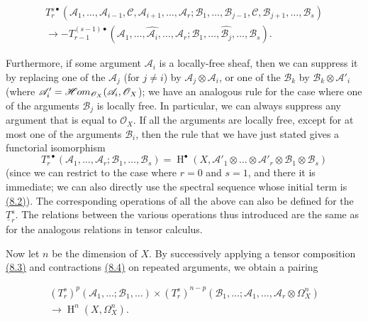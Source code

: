 \documentclass{article}
\newenvironment{eqenv}
  {}
  {}
\theoremstyle{definition}
\theoremstyle{definition}
\theoremstyle{definition}
\theoremstyle{definition}
\theoremstyle{remark}
\begin{document}
\leavevmode{}%
\begin{eqenv}
\[
  \begin{gathered}
    T_r^{s\bullet}({\mathscr{A}}_1,\ldots,{\mathscr{A}}_{i-1},{\mathscr{C}},{\mathscr{A}}_{i+1},\ldots,{\mathscr{A}}_r;{\mathscr{B}}_1,\ldots,{\mathscr{B}}_{j-1},{\mathscr{C}},{\mathscr{B}}_{j+1},\ldots,{\mathscr{B}}_s)
  \\\to -T_{r-1}^{(s-1)\bullet}({\mathscr{A}}_1,\ldots,\widehat{{\mathscr{A}}_i},\ldots,{\mathscr{A}}_r;{\mathscr{B}}_1,\ldots,\widehat{{\mathscr{B}}_j},\ldots,{\mathscr{B}}_s).
  \end{gathered}
\tag{8.4}
\]

\end{eqenv}

Furthermore, if some argument \({\mathscr{A}}_i\) is a locally-free sheaf, then we can suppress it by replacing one of the \({\mathscr{A}}_j\) (for \(j\neq i\)) by \({\mathscr{A}}_j\otimes{\mathscr{A}}_i\), or one of the \({\mathscr{B}}_k\) by \({\mathscr{B}}_k\otimes{\mathscr{A}}'_i\) (where \({\mathscr{A}}'_i=\mathscr{H}\kern -.5pt om_{{\mathscr{O}}_X}({\mathscr{A}}_i,{\mathscr{O}}_X\));
we have an analogous rule for the case where one of the arguments \({\mathscr{B}}_j\) is locally free.
In particular, we can always suppress any argument that is equal to \({\mathscr{O}}_X\).
If all the arguments are locally free, except for at most one of the arguments \({\mathscr{B}}_i\), then the rule that we have just stated gives a functorial isomorphism
\[
  T_r^{s\bullet}({\mathscr{A}}_1,\ldots,{\mathscr{A}}_r;{\mathscr{B}}_1,\ldots,{\mathscr{B}}_s)
  = \operatorname{H}^\bullet(X,{\mathscr{A}}'_1\otimes\ldots\otimes{\mathscr{A}}'_{r}\otimes{\mathscr{B}}_1\otimes{\mathscr{B}}_s)
\tag{8.5}
\]
(since we can restrict to the case where \(r=0\) and \(s=1\), and there it is immediate;
we can also directly use the spectral sequence whose initial term is \protect\hyperlink{fga-1-equation-8.2}{(8.2)}).
The corresponding operations of all the above can also be defined for the \(\underline{T}_r^s\).
The relations between the various operations thus introduced are the same as for the analogous relations in tensor calculus.

Now let \(n\) be the dimension of \(X\).
By successively applying a tensor composition \protect\hyperlink{fga-1-equation-8.3}{(8.3)} and contractions \protect\hyperlink{fga-1-equation-8.4}{(8.4)} on repeated arguments, we obtain a pairing

\leavevmode{}%
\begin{eqenv}
\[
  \begin{gathered}
    (T_r^s)^p({\mathscr{A}}_1,\ldots;{\mathscr{B}}_1,\ldots)
    \times (T_r^s)^{n-p}({\mathscr{B}}_1,\ldots;{\mathscr{A}}_1,\ldots,{\mathscr{A}}_r\otimes\Omega_X^n)
  \\\longrightarrow\operatorname{H}^n(X,\Omega_X^n).
  \end{gathered}
\tag{8.6}
\]

\end{eqenv}
\end{document}
